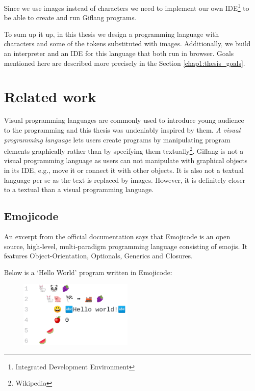 Since we use images instead of characters we need to implement our own IDE\footnote{Integrated Development Environment} to be able to
create and run Giflang programs.

To sum up it up, in this thesis we design a programming language with characters and some of the tokens substituted with images.
Additionally, we build an interpreter and an IDE for this language that both run in browser. Goals mentioned here are described
more precisely in the Section \ref{chap1:thesis_goals}. 

\section{Related work}
\label{chap1:related_work}
Visual programming languages are commonly used to introduce young audience to the programming and this thesis was undeniably inspired by them.
\emph{A visual programming language} lets users create programs by manipulating program elements graphically rather than by specifying them
textually\footnote{Wikipedia}. Giflang is not a visual programming language as users can not manipulate with graphical objects in its IDE, e.g.,
move it or connect it with other objects. It is also not a textual language per se as the text is replaced by images. However, it is definitely closer
to a textual than a visual programming language.

\subsection{Emojicode}
An excerpt from the official documentation says that Emojicode \cite{Emojicode} is an open source, high-level, multi-paradigm programming language consisting of emojis.
It features Object-Orientation, Optionals, Generics and Closures.

Below is a `Hello World' program written in Emojicode:
\begin{figure}[!hbt]
	\includegraphics[width=0.5\textwidth]{../img/emojicode_helloworld}
	\label{fig:chap1:emojicode_helloworld}
\end{figure}

